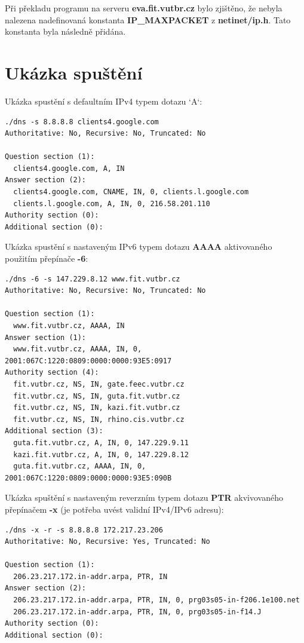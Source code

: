 \documentclass[a4paper,11pt]{article}
\begin{document}
Při překladu programu na serveru \textbf{eva.fit.vutbr.cz} bylo zjištěno, že nebyla nalezena nadefinovaná konstanta \textbf{IP\_MAXPACKET} z \textbf{netinet/ip.h}. Tato konstanta byla následně přidána.

\section{Ukázka spuštění}

Ukázka spustění s defaultním IPv4 typem dotazu `A`:

\begin{lstlisting}[frame=single,breaklines]
./dns -s 8.8.8.8 clients4.google.com
Authoritative: No, Recursive: No, Truncated: No

Question section (1):
  clients4.google.com, A, IN
Answer section (2):
  clients4.google.com, CNAME, IN, 0, clients.l.google.com
  clients.l.google.com, A, IN, 0, 216.58.201.110
Authority section (0):
Additional section (0):
\end{lstlisting}

\newpage

Ukázka spustění s nastaveným IPv6 typem dotazu \textbf{AAAA} aktivovaného použitím přepínače \textbf{-6}:

\begin{lstlisting}[frame=single,breaklines]
./dns -6 -s 147.229.8.12 www.fit.vutbr.cz
Authoritative: No, Recursive: No, Truncated: No

Question section (1):
  www.fit.vutbr.cz, AAAA, IN
Answer section (1):
  www.fit.vutbr.cz, AAAA, IN, 0, 2001:067C:1220:0809:0000:0000:93E5:0917
Authority section (4):
  fit.vutbr.cz, NS, IN, gate.feec.vutbr.cz
  fit.vutbr.cz, NS, IN, guta.fit.vutbr.cz
  fit.vutbr.cz, NS, IN, kazi.fit.vutbr.cz
  fit.vutbr.cz, NS, IN, rhino.cis.vutbr.cz
Additional section (3):
  guta.fit.vutbr.cz, A, IN, 0, 147.229.9.11
  kazi.fit.vutbr.cz, A, IN, 0, 147.229.8.12
  guta.fit.vutbr.cz, AAAA, IN, 0, 2001:067C:1220:0809:0000:0000:93E5:090B
\end{lstlisting}

Ukázka spuštění s nastaveným reverzním typem dotazu \textbf{PTR} akvivovaného přepínačem \textbf{-x} (je potřeba uvést validní IPv4/IPv6 adresu):

\begin{lstlisting}[frame=single,breaklines]
./dns -x -r -s 8.8.8.8 172.217.23.206
Authoritative: No, Recursive: Yes, Truncated: No

Question section (1):
  206.23.217.172.in-addr.arpa, PTR, IN
Answer section (2):
  206.23.217.172.in-addr.arpa, PTR, IN, 0, prg03s05-in-f206.1e100.net
  206.23.217.172.in-addr.arpa, PTR, IN, 0, prg03s05-in-f14.J
Authority section (0):
Additional section (0):
\end{lstlisting}
\end{document}
